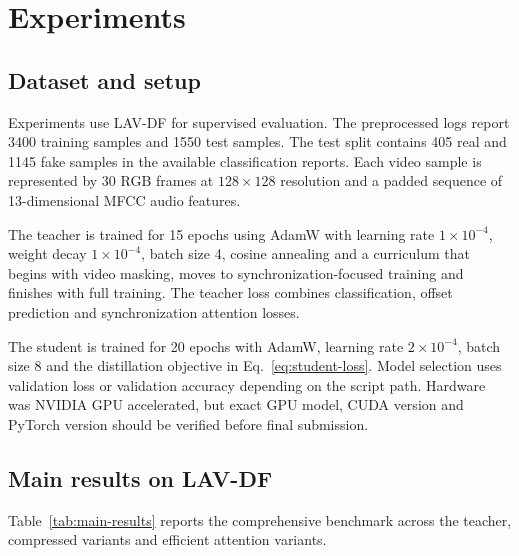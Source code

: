 \documentclass[pdflatex,sn-basic,Numbered]{sn-jnl}
\begin{document}
\section{Experiments}\label{sec:experiments}

\subsection{Dataset and setup}\label{subsec:setup}

Experiments use LAV-DF \cite{cai2022lavdf} for supervised evaluation. The preprocessed logs report 3400 training samples and 1550 test samples. The test split contains 405 real and 1145 fake samples in the available classification reports. Each video sample is represented by 30 RGB frames at $128 \times 128$ resolution and a padded sequence of 13-dimensional MFCC audio features.

The teacher is trained for 15 epochs using AdamW with learning rate $1 \times 10^{-4}$, weight decay $1 \times 10^{-4}$, batch size 4, cosine annealing and a curriculum that begins with video masking, moves to synchronization-focused training and finishes with full training. The teacher loss combines classification, offset prediction and synchronization attention losses.

The student is trained for 20 epochs with AdamW, learning rate $2 \times 10^{-4}$, batch size 8 and the distillation objective in Eq.~\eqref{eq:student-loss}. Model selection uses validation loss or validation accuracy depending on the script path. Hardware was NVIDIA GPU accelerated, but exact GPU model, CUDA version and PyTorch version should be verified before final submission.

\subsection{Main results on LAV-DF}\label{subsec:main-results}

Table~\ref{tab:main-results} reports the comprehensive benchmark across the teacher, compressed variants and efficient attention variants.
\end{document}
